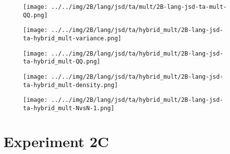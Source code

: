 \begin{figure}[H]
\centering	\texttt{[image: ../../img/2B/lang/jsd/ta/mult/2B-lang-jsd-ta-mult-QQ.png]}
\end{figure}
\begin{figure}[H]
\centering	\texttt{[image: ../../img/2B/lang/jsd/ta/hybrid\_mult/2B-lang-jsd-ta-hybrid\_mult-variance.png]}
\end{figure}
\begin{figure}[H]
\centering	\texttt{[image: ../../img/2B/lang/jsd/ta/hybrid\_mult/2B-lang-jsd-ta-hybrid\_mult-QQ.png]}
\end{figure}
\begin{figure}[H]
\centering	\texttt{[image: ../../img/2B/lang/jsd/ta/hybrid\_mult/2B-lang-jsd-ta-hybrid\_mult-density.png]}
\end{figure}
\begin{figure}[H]
\centering	\texttt{[image: ../../img/2B/lang/jsd/ta/hybrid\_mult/2B-lang-jsd-ta-hybrid\_mult-NvsN-1.png]}
\end{figure}
\section{Experiment 2C}
